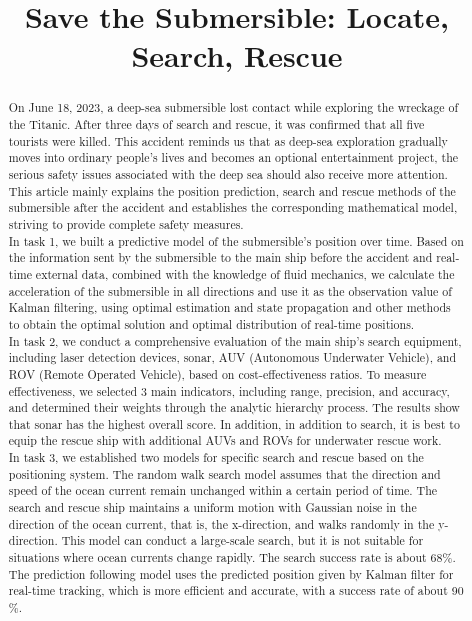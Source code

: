 \documentclass[12pt]{article}  %
\title{Save the Submersible: Locate, Search, Rescue}  %
\begin{document}
\begin{abstract}
    
 \indent On June 18, 2023, a deep-sea submersible lost contact while exploring the wreckage of the Titanic. After three days of search and rescue, it was confirmed that all five tourists were killed. This accident reminds us that as deep-sea exploration gradually moves into ordinary people's lives and becomes an optional entertainment project, the serious safety issues associated with the deep sea should also receive more attention. This article mainly explains the position prediction, search and rescue methods of the submersible after the accident and establishes the corresponding mathematical model, striving to provide complete safety measures.\\
 \indent In task 1, we built a predictive model of the submersible's position over time. Based on the information sent by the submersible to the main ship before the accident and real-time external data, combined with the knowledge of fluid mechanics, we calculate the acceleration of the submersible in all directions and use it as the observation value of Kalman filtering, using optimal estimation and state propagation and other methods to obtain the optimal solution and optimal distribution of real-time positions.\\
 \indent In task 2, we conduct a comprehensive evaluation of the main ship's search equipment, including laser detection devices, sonar, AUV (Autonomous Underwater Vehicle), and ROV (Remote Operated Vehicle), based on cost-effectiveness ratios. To measure effectiveness, we selected 3 main indicators, including range, precision, and accuracy, and determined their weights through the analytic hierarchy process. The results show that sonar has the highest overall score. In addition, in addition to search, it is best to equip the rescue ship with additional AUVs and ROVs for underwater rescue work.\\
 \indent In task 3, we established two models for specific search and rescue based on the positioning system. The random walk search model assumes that the direction and speed of the ocean current remain unchanged within a certain period of time. The search and rescue ship maintains a uniform motion with Gaussian noise in the direction of the ocean current, that is, the x-direction, and walks randomly in the y-direction. This model can conduct a large-scale search, but it is not suitable for situations where ocean currents change rapidly. The search success rate is about 68$\%$. The prediction following model uses the predicted position given by Kalman filter for real-time tracking, which is more efficient and accurate, with a success rate of about 90$\%$.\\

\end{abstract}
\end{document}
